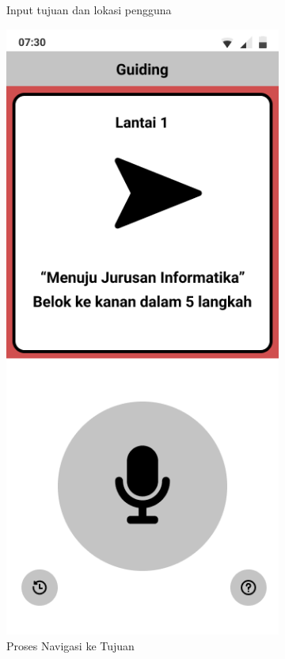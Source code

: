 \begin{enumerate}
\begin{figure} [H]
\begin{subfigure}{.5\textwidth}
  		\caption{Input tujuan dan lokasi pengguna}
	\end{subfigure}
		\vspace{1cm}
		\newline
	\begin{subfigure}{.5\textwidth}
  		\centering
	  	\includegraphics[width=.5\linewidth]{gambar/bab3/3}  
  		\caption{Proses Navigasi ke Tujuan}
	\end{subfigure}
	\begin{subfigure}{.5\textwidth}
  		\centering

\end{subfigure}
\end{figure}
\end{enumerate}
